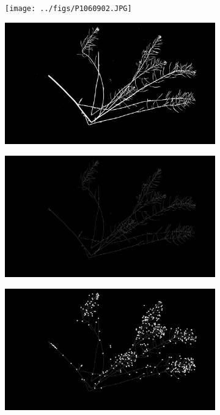 \documentclass[12pt,]{article}
\begin{document}
\begin{figure}
    \centering
    \begin{subfigure}[t]{0.8\textwidth}
        \centering
        \texttt{[image: ../figs/P1060902.JPG]}
        \caption{} \label{fig:original}
    \end{subfigure}
    \begin{subfigure}[t]{0.45\textwidth}
        \centering
        \includegraphics[width=\linewidth]{../figs/P1060902.JPG_proc.jpeg}
        \caption{} \label{fig:segmented}
    \end{subfigure}
    \begin{subfigure}[t]{0.45\textwidth}
        \centering
        \includegraphics[width=\linewidth]{../figs/P1060902.JPG_proc_sk.jpeg}
        \caption{} \label{fig:sk}
    \end{subfigure}
        \begin{subfigure}[t]{0.45\textwidth}
        \centering
        \includegraphics[width=\linewidth]{../figs/P1060902.JPG_proc_ends.jpeg}

\end{subfigure}
\end{figure}
\end{document}
